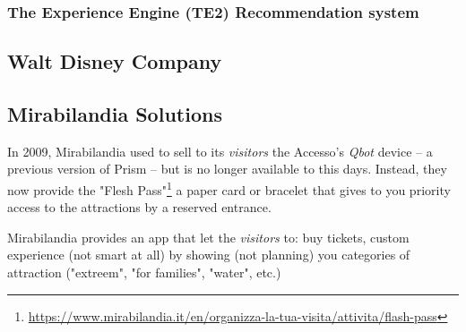
\subsubsection{The Experience Engine (TE2) Recommendation system}

\subsection{Walt Disney Company}\label{subsec:walt-disney-company}

\subsection{Mirabilandia Solutions}\label{subsec:mirabilandia-solutions}
In 2009, Mirabilandia used to sell to its \textit{visitors} the Accesso's \textit{Qbot} device -- a previous version of Prism -- but is no
longer available to this days.
Instead, they now provide the "Flesh Pass"\footnote{\url{https://www.mirabilandia.it/en/organizza-la-tua-visita/attivita/flash-pass}}
a paper card or bracelet that gives to you priority access to the attractions by a reserved entrance.

Mirabilandia provides an app that let the \textit{visitors} to:
buy tickets, custom experience (not smart at all) by showing (not planning) you categories of attraction
("extreem", "for families", "water", etc.)
